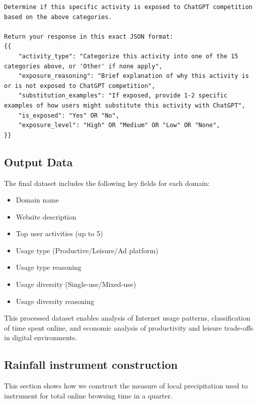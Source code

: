 \documentclass[12pt]{article}
\begin{document}
\begin{verbatim}
Determine if this specific activity is exposed to ChatGPT competition based on the above categories.

Return your response in this exact JSON format:
{{
    "activity_type": "Categorize this activity into one of the 15 categories above, or 'Other' if none apply",
    "exposure_reasoning": "Brief explanation of why this activity is or is not exposed to ChatGPT competition",
    "substitution_examples": "If exposed, provide 1-2 specific examples of how users might substitute this activity with ChatGPT",
    "is_exposed": "Yes" OR "No",
    "exposure_level": "High" OR "Medium" OR "Low" OR "None",
}}
\end{verbatim}




\subsection*{Output Data}
\normalsize
The final dataset includes the following key fields for each domain:
\begin{itemize}
    \item Domain name
    \item Website description
    \item Top user activities (up to 5)
    \item Usage type (Productive/Leisure/Ad platform)
    \item Usage type reasoning
    \item Usage diversity (Single-use/Mixed-use)
    \item Usage diversity reasoning
\end{itemize}

This processed dataset enables analysis of Internet usage patterns, classification of time spent online, and economic analysis of productivity and leisure trade-offs in digital environments.


\subsection{Rainfall instrument construction} \label{sec:rain-instrument}

This section shows how we construct the measure of local precipitation used to instrument for total online browsing time in a quarter.
\end{document}
